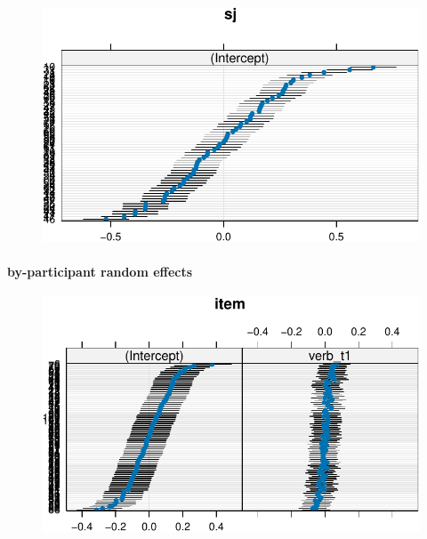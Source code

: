 \documentclass[
  letterpaper,
  DIV=11,
  numbers=noendperiod]{scrartcl}
\let\oldparagraph\paragraph
\renewcommand{\paragraph}[1]{\oldparagraph{#1}\mbox{}}
\newenvironment{Shaded}{\begin{snugshade}}{\end{snugshade}}
\newcommand{\FunctionTok}[1]{\textcolor[rgb]{0.28,0.35,0.67}{#1}}
\newcommand{\NormalTok}[1]{\textcolor[rgb]{0.00,0.23,0.31}{#1}}
\newcommand{\SpecialCharTok}[1]{\textcolor[rgb]{0.37,0.37,0.37}{#1}}
\begin{document}
\begin{figure}[H]

{\centering \includegraphics{12-model_selection_example_files/figure-pdf/unnamed-chunk-37-1.pdf}

}

\end{figure}

\hypertarget{by-participant-random-effects}{%
\paragraph{by-participant random
effects}\label{by-participant-random-effects}}

\begin{Shaded}
\end{Shaded}

\begin{figure}[H]

{\centering \includegraphics{12-model_selection_example_files/figure-pdf/unnamed-chunk-38-1.pdf}

}

\end{figure}
\end{document}
